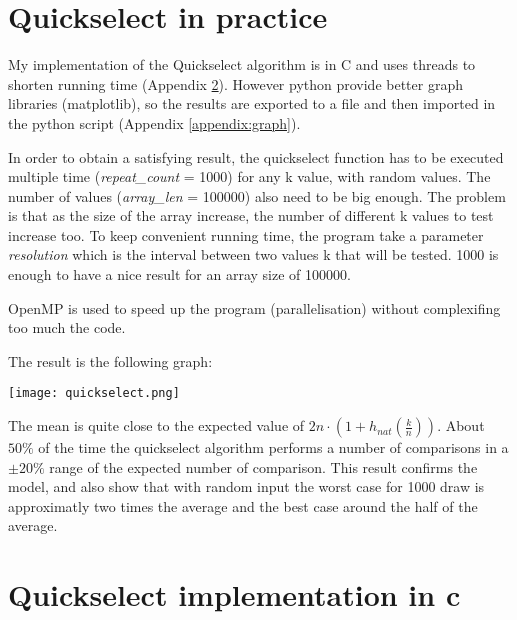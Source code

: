 \documentclass[11pt]{article}
\begin{document}
\section{Quickselect in practice}

My implementation of the Quickselect algorithm is in C and uses threads to shorten running time (Appendix \ref{appendix:quickselect}). 
However python provide better graph libraries (matplotlib), so the results are exported to a file and then imported in the python script (Appendix \ref{appendix:graph}).

In order to obtain a satisfying result, the quickselect function has to be executed multiple time (\textit{repeat\_count} = 1000) for any k value, with random values. The number of values (\textit{array\_len} = 100000) also need to be big enough. The problem is that as the size of the array increase, the number of different k values to test increase too. To keep convenient running time, the program take a parameter \textit{resolution} which is the interval between two values k that will be tested. 1000 is enough to have a nice result for an array size of 100000. 

OpenMP is used to speed up the program (parallelisation) without complexifing too much the code.

\newpage

The result is the following graph:

\hspace*{-50mm}
\texttt{[image: quickselect.png]}

The mean is quite close to the expected value of $2n \cdot ( 1 + h_{nat}(\frac{k}{n}))$. About $50\%$ of the time the quickselect algorithm performs a number of comparisons in a $\pm 20\%$ range of the expected number of comparison. This result confirms the model, and also show that with random input the worst case for 1000 draw is approximatly two times the average and the best case around the half of the average.

\newpage

\appendix
\section{Quickselect implementation in c}\label{appendix:quickselect}
\end{document}
